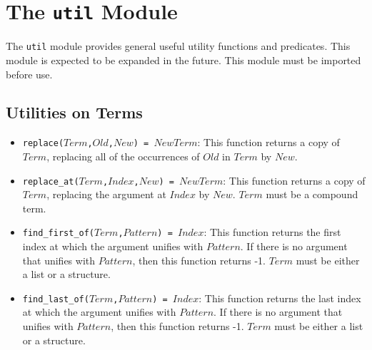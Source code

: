 \chapter{The \texttt{util} Module}
The \texttt{util} module provides general useful utility functions and predicates. This module is expected to be expanded in the future. This module must be imported before use.

\section{Utilities on Terms}
\begin{itemize}
\item \texttt{replace($Term$,$Old$,$New$) = $NewTerm$}: This function returns a copy of $Term$, replacing all of the occurrences of $Old$ in $Term$ by $New$.
\item \texttt{replace\_at($Term$,$Index$,$New$) = $NewTerm$}: This function returns a copy of $Term$, replacing the argument at $Index$ by $New$. $Term$ must be a compound term.
\item \texttt{find\_first\_of($Term$,$Pattern$) = $Index$}: This function returns the first index at which the argument unifies with $Pattern$. If there is no argument that unifies with $Pattern$, then this function returns -1. $Term$ must be either a list or a structure.
\item \texttt{find\_last\_of($Term$,$Pattern$) = $Index$}: This function returns the last index at which the argument unifies with $Pattern$. If there is no argument that unifies with $Pattern$, then this function returns -1. $Term$ must be either a list or a structure.

\end{itemize}


